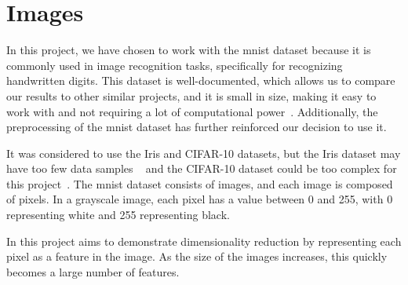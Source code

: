 \section{Images}\label{sec:images}


In this project, we have chosen to work with the \gls{mnist} dataset because it is commonly used in image recognition tasks, specifically for recognizing handwritten digits. This dataset is well-documented, which allows us to compare our results to other similar projects, and it is small in size, making it easy to work with and not requiring a lot of computational power~\cite{lecun-mnist-database}. Additionally, the preprocessing of the \gls{mnist} dataset has further reinforced our decision to use it.

It was considered to use the Iris and CIFAR-10 datasets, but the Iris dataset may have too few data samples ~\cite{mnist-vs-iris} and the CIFAR-10 dataset could be too complex for this project~\cite{datasets-uniqtech}. The \gls{mnist} dataset consists of images, and each image is composed of pixels. In a grayscale image, each pixel has a value between 0 and 255, with 0 representing white and 255 representing black.

In this project aims to demonstrate dimensionality reduction by representing each pixel as a feature in the image. As the size of the images increases, this quickly becomes a large number of features.